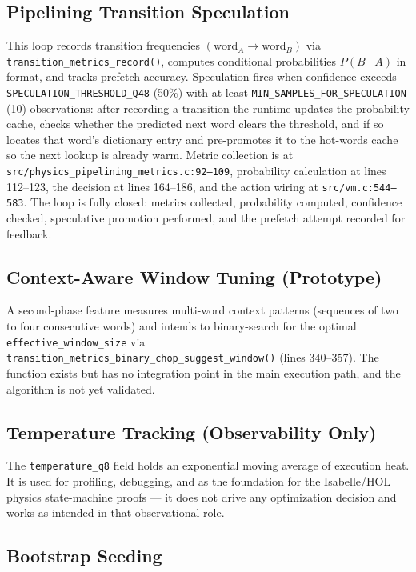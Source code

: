 \subsection{Pipelining Transition Speculation}

This loop records transition frequencies $(\text{word}_A \rightarrow
\text{word}_B)$ via \texttt{transition\_metrics\_record()}, computes conditional
probabilities $P(B \mid A)$ in \Qtype{} format, and tracks prefetch accuracy.
Speculation fires when confidence exceeds \texttt{SPECULATION\_THRESHOLD\_Q48}
(50\%) with at least \texttt{MIN\_SAMPLES\_FOR\_SPECULATION} (10) observations:
after recording a transition the runtime updates the probability cache, checks
whether the predicted next word clears the threshold, and if so locates that
word's dictionary entry and pre-promotes it to the hot-words cache so the next
lookup is already warm. Metric collection is at
\texttt{src/physics\_pipelining\_metrics.c:92--109}, probability calculation at
lines 112--123, the decision at lines 164--186, and the action wiring at
\texttt{src/vm.c:544--583}. The loop is fully closed: metrics collected,
probability computed, confidence checked, speculative promotion performed, and
the prefetch attempt recorded for feedback.

\subsection{Context-Aware Window Tuning (Prototype)}

A second-phase feature measures multi-word context patterns (sequences of two to
four consecutive words) and intends to binary-search for the optimal
\texttt{effective\_window\_size} via
\texttt{transition\_metrics\_binary\_chop\_suggest\_window()} (lines 340--357).
The function exists but has no integration point in the main execution path, and
the algorithm is not yet validated.

\subsection{Temperature Tracking (Observability Only)}

The \texttt{temperature\_q8} field holds an exponential moving average of
execution heat. It is used for profiling, debugging, and as the foundation for
the Isabelle/HOL physics state-machine proofs --- it does not drive any
optimization decision and works as intended in that observational role.

\subsection{Bootstrap Seeding}

